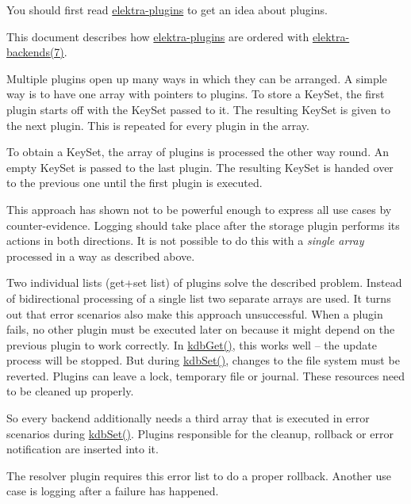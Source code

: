 You should first read \mbox{\hyperlink{src_plugins_README_md}{elektra-\/plugins}} to get an idea about plugins.

This document describes how \mbox{\hyperlink{src_plugins_README_md}{elektra-\/plugins}} are ordered with \mbox{\hyperlink{doc_help_elektra-backends_md}{elektra-\/backends(7)}}.

Multiple plugins open up many ways in which they can be arranged. A simple way is to have one array with pointers to plugins. To store a {\ttfamily Key\+Set}, the first plugin starts off with the {\ttfamily Key\+Set} passed to it. The resulting {\ttfamily Key\+Set} is given to the next plugin. This is repeated for every plugin in the array.

To obtain a {\ttfamily Key\+Set}, the array of plugins is processed the other way round. An empty {\ttfamily Key\+Set} is passed to the last plugin. The resulting {\ttfamily Key\+Set} is handed over to the previous one until the first plugin is executed.

This approach has shown not to be powerful enough to express all use cases by counter-\/evidence. Logging should take place after the storage plugin performs its actions in both directions. It is not possible to do this with a {\itshape single array} processed in a way as described above.

Two individual lists (get+set list) of plugins solve the described problem. Instead of bidirectional processing of a single list two separate arrays are used. It turns out that error scenarios also make this approach unsuccessful. When a plugin fails, no other plugin must be executed later on because it might depend on the previous plugin to work correctly. In {\ttfamily \mbox{\hyperlink{group__kdb_ga28e385fd9cb7ccfe0b2f1ed2f62453a1}{kdb\+Get()}}}, this works well -- the update process will be stopped. But during {\ttfamily \mbox{\hyperlink{group__kdb_ga11436b058408f83d303ca5e996832bcf}{kdb\+Set()}}}, changes to the file system must be reverted. Plugins can leave a lock, temporary file or journal. These resources need to be cleaned up properly.

So every backend additionally needs a third array that is executed in error scenarios during {\ttfamily \mbox{\hyperlink{group__kdb_ga11436b058408f83d303ca5e996832bcf}{kdb\+Set()}}}. Plugins responsible for the cleanup, rollback or error notification are inserted into it.

The resolver plugin requires this error list to do a proper rollback. Another use case is logging after a failure has happened.

